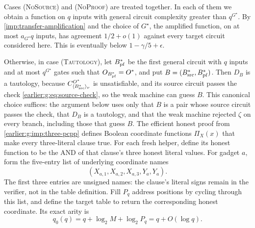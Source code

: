 Cases (\textsc{NoSource}) and (\textsc{NoProof}) are treated together. In each of them
we obtain a function on $q$ inputs with general circuit complexity
greater than $q^{G^\star}$. By
\cref{imp:transfer-amplification} and the choice of ${G^\star}$, the
amplified function, on at most $a_{{G^\star}}q$ inputs, has agreement $1/2+o(1)$
against every target circuit considered here. This is eventually below
$1-\gamma/5+\epsilon$.

Otherwise, in case (\textsc{Tautology}), let $B^*_{\rm pf}$ be the first
general circuit with $q$ inputs and at most $q^{G^\star}$ gates such that
$O_{B^*_{\rm pf}}=O^*$, and put
$B=(B^*_{\rm src},B^*_{\rm pf})$. Then $D_B$ is a tautology, because
$C^{O^*}_{\langle B^*_{\rm src}\rangle_\nu}$ is unsatisfiable, and its
source circuit passes the check \eqref{earlier:g:eq:source-check}, so the weak
machine can guess $B$. This canonical choice suffices: the argument
below uses only that $B$ is a pair whose source circuit passes the
check, that $D_B$ is a tautology, and that the weak machine rejected $\zeta$
on every branch, including those that guess $B$. The efficient honest proof from
\cref{earlier:g:imp:three-pcpp} defines Boolean coordinate functions $\Pi_X(x)$
that make every three-literal clause true. For each fresh helper, define its
honest function to be the AND of that clause's three honest literal
values. For gadget $a$, form the five-entry list of underlying
coordinate names
\[
 (X_{a,1},X_{a,2},X_{a,3},Y_a,Y_a).
\]
The first three entries are unsigned names: the clause's literal
signs remain in the verifier, not in the table definition. Fill
$P_q$ address positions by cycling through this list, and define
the target table to return the corresponding honest coordinate.
Its exact arity is
\begin{equation}\label{earlier:g:eq:gadget-table-arity}
 q_0(q)=q+\log_2M+\log_2P_q=q+O(\log q).
\end{equation}



